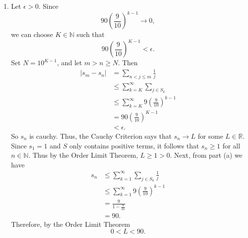 \documentclass[12pt]{article}
\begin{document}
\begin{enumerate}[label=(\alph*)]
    \item Let \( \epsilon > 0 \). Since
          \[
              90 (\frac{9}{10})^{k-1} \to 0,
          \]
          we can choose \( K \in \mathbb{N} \) such that
          \[
              90 (\frac{9}{10})^{K-1} < \epsilon.
          \]
          Set \( N = 10^{K-1} \), and let \( m > n \geq N \).
          Then
          \[
              \begin{split}
                  \vert s_m - s_n \vert & = \sum_{n < j \leq m} \frac{1}{j}                          \\
                                        & \leq \sum_{k=K}^{\infty} \sum_{j \in S_k}                  \\
                                        & \leq \sum_{k=K}^{\infty} 9 \left(\frac{9}{10}\right)^{k-1} \\
                                        & = 90 \left(\frac{9}{10}\right)^{K-1}                       \\
                                        & < \epsilon.
              \end{split}
          \]
          So \( s_n \) is cauchy.
          Thus, the Cauchy Criterion says that \( s_n \to L \) for some \( L \in \mathbb{R} \).
          Since \( s_1 = 1 \) and \( S \) only contains positive terms, it follows that \( s_n \geq 1\) for all \( n \in \mathbb{N} \).
          Thus by the Order Limit Theorem, \( L \geq 1 > 0 \).
          Next, from part (a) we have
          \[
              \begin{aligned}
                  s_n
                   & \le \sum_{k=1}^{\infty}\sum_{j\in S_k}\frac1j         \\
                   & \le \sum_{k=1}^{\infty}9\left(\frac9{10}\right)^{k-1} \\
                   & =\frac9{1-\frac9{10}}                                 \\
                   & =90.
              \end{aligned}
          \]
          Therefore, by the Order Limit Theorem
          \[
              0 < L < 90.
          \]

\end{enumerate}
\end{document}
